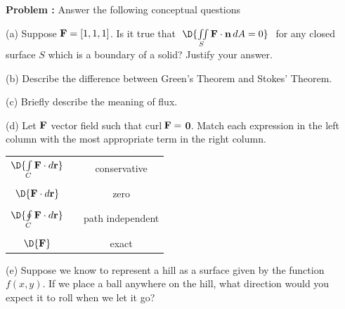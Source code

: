 {\bf Problem :} Answer the following conceptual questions

\vspace{0.1cm}

(a) \quad Suppose $\text{{\bf F}} = [1,1,1]$.  Is it true that \,\,$\D{\iint \limits_{S} \text{\bf F}\cdot \text{\bf n} \, dA = 0}$ \,\,for any closed surface $S$ which is a boundary of a solid?  Justify your answer.

\vspace{4.0cm}

(b) \quad Describe the difference between Green's Theorem and Stokes' Theorem.

\vspace{4.0cm}

(c) \quad Briefly describe the meaning of flux.

\vspace{4.0cm}

(d) Let $\text{\bf F}$ vector field such that curl\,$\text{\bf F} =$ {\bf 0}.  Match each expression in the left column with the most appropriate term in the right column.

\begin{center}
\setlength{\extrarowheight}{0.8cm}
\begin{tabular}{cp{5cm}c}
	$\D{\int \limits_{C} \text{\bf F}\cdot d\text{\bf r}}$ & & conservative\\
	&&\\
	$\D{\text{\bf F}\cdot d\text{\bf r}}$ & & zero\\
	&&\\
	$\D{\oint \limits_{C} \text{\bf F}\cdot d\text{\bf r}}$ & & path independent\\
	&&\\
	$\D{\text{\bf F}}$ & & exact\\
\end{tabular}
\end{center}

\vspace{0.4cm}

(e) Suppose we know to represent a hill as a surface given by the function $f(x,y)$.  If we place a ball anywhere on the hill, what direction would you expect it to roll when we let it go?
